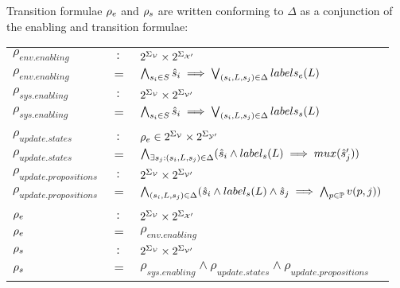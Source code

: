 Transition formulae ${\rho_e}$ and ${\rho_s}$ are written conforming to $\Delta$ as a conjunction of the enabling and transition formulae:

\vspace{1em}
\begin{tabular}{ l c l }
	$\rho_{env.enabling}$&$:$&$2^{\Sigma_{{\mathcal{V}}}} \times 2^{\Sigma_{{\mathcal{X}}'}}$\\
	$\rho_{env.enabling}$ &$=$& $\bigwedge_{s_i \in S} \hat{s}_{i} \implies \bigvee_{(s_i,L,s_j) \in \Delta}labels_e(L)$\\
	$\rho_{sys.enabling}$&$:$&$2^{\Sigma_{{\mathcal{V}}}} \times 2^{\Sigma_{{\mathcal{V}}'}}$\\
	$\rho_{sys.enabling}$ &$=$& $\bigwedge_{s_i \in S} \hat{s}_{i} \implies \bigvee_{(s_i,L,s_j) \in \Delta}labels_s(L)$\\
	&&\\
	$\rho_{update.states}$&$:$&${\rho_e}  \in 2^{\Sigma_{{\mathcal{V}}}} \times 2^{\Sigma_{{\mathcal{Y}}'}}$\\
$\rho_{update.states}$&$=$&$\bigwedge_{\exists s_j:(s_i,L,s_j) \in \Delta} (\hat{s}_{i} \wedge label_s(L) \implies mux(\hat{s}_{j}') ) $\\	
	$\rho_{update.propositions}$&$:$&$2^{\Sigma_{{\mathcal{V}}}} \times 2^{\Sigma_{{\mathcal{V}}'}}$\\
	$\rho_{update.propositions}$&$=$&$\bigwedge_{(s_i,L,s_j) \in \Delta} (\hat{s}_{i} \wedge label_s(L) \wedge \hat{s}_{j} \implies \bigwedge_{p \in \mathbb{P}}v(p,j) )$\\
	&&\\
	${\rho_e}$&$:$&$2^{\Sigma_{{\mathcal{V}}}} \times 2^{\Sigma_{{\mathcal{X}}'}}$\\
	${\rho_e}$&$=$&$\rho_{env.enabling}$\\		
	${\rho_s}$&$:$&$2^{\Sigma_{{\mathcal{V}}}} \times 2^{\Sigma_{{\mathcal{V}}'}}$\\	
	${\rho_s}$&$=$&$\rho_{sys.enabling} \wedge  \rho_{update.states} \wedge  \rho_{update.propositions}$\\	
\end{tabular}
\vspace{1em}


